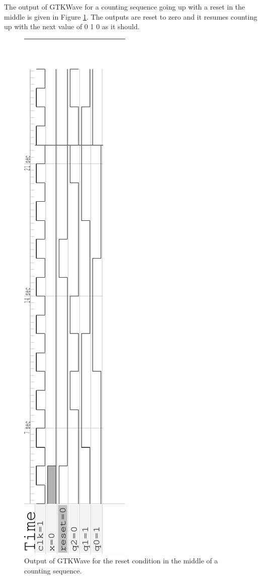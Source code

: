 \documentclass[12pt]{article}
\begin{document}
The output of GTKWave for a counting sequence going up with
a reset in the middle is given in Figure \ref{fig:wavereset}.
The outputs are reset to zero and it resumes counting up with
the next value of 0 1 0 as it should.

\begin{figure}
\includegraphics[angle=-90,scale=0.7]{verilog/3bitcounter-reset}
\caption{Output of GTKWave for the reset condition in the middle
of a counting sequence.}
\label{fig:wavereset}
\end{figure}
\end{document}
